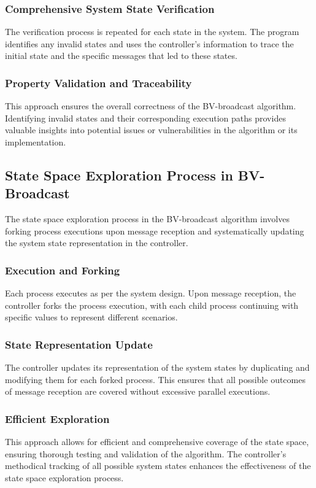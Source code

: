 \documentclass[a4paper,11pt,oneside]{report}
\begin{document}
\subsubsection{Comprehensive System State Verification}
The verification process is repeated for each state in the system. The program identifies any invalid states and uses the controller's information to trace the initial state and the specific messages that led to these states.

\subsubsection{Property Validation and Traceability}
This approach ensures the overall correctness of the BV-broadcast algorithm. Identifying invalid states and their corresponding execution paths provides valuable insights into potential issues or vulnerabilities in the algorithm or its implementation.

\subsection{State Space Exploration Process in BV-Broadcast}
The state space exploration process in the BV-broadcast algorithm involves forking process executions upon message reception and systematically updating the system state representation in the controller.

\subsubsection{Execution and Forking}
Each process executes as per the system design. Upon message reception, the controller forks the process execution, with each child process continuing with specific values to represent different scenarios.

\subsubsection{State Representation Update}
The controller updates its representation of the system states by duplicating and modifying them for each forked process. This ensures that all possible outcomes of message reception are covered without excessive parallel executions.

\subsubsection{Efficient Exploration}
This approach allows for efficient and comprehensive coverage of the state space, ensuring thorough testing and validation of the algorithm. The controller's methodical tracking of all possible system states enhances the effectiveness of the state space exploration process.
\end{document}
